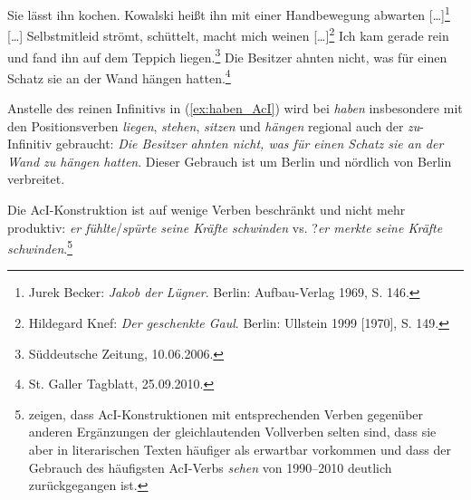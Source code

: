 \ea \label{ea:andere_AcI_Verben}
\ea \label{ea:lassen_AcI} Sie lässt ihn kochen.
 \ex \label{ex:heißen_AcI} Kowalski heißt ihn mit einer Handbewegung abwarten [\ldots{}]\footnote{Jurek Becker: \textit{Jakob der Lügner}. Berlin: Aufbau-Verlag 1969, S. 146.}
 \ex \label{ex:machen_Inf} [\ldots{}] Selbstmitleid strömt, schüttelt, macht mich weinen [\ldots{}]\footnote{Hildegard Knef: \textit{Der geschenkte Gaul}. Berlin: Ullstein 1999 [1970], S. 149.}
 \ex \label{ex:finden_AcI} Ich kam gerade rein und fand ihn auf dem Teppich liegen.\footnote{Süddeutsche Zeitung, 10.06.2006.}
 \ex \label{ex:haben_AcI} Die Besitzer ahnten nicht, was für einen Schatz sie an der Wand hängen hatten.\footnote{St. Galler Tagblatt, 25.09.2010.}
 \z 
 \z 
 
Anstelle des reinen Infinitivs in (\ref{ex:haben_AcI}) wird bei \textit{haben} insbesondere mit den Positionsverben \textit{liegen}, \textit{stehen}, \textit{sitzen} und \textit{hängen} regional auch der \textit{zu}-Infinitiv gebraucht: \textit{Die Besitzer ahnten nicht, was für einen Schatz sie an der Wand zu hängen hatten}. Dieser Gebrauch ist um Berlin und nördlich von Berlin verbreitet.

Die AcI-Konstruktion ist auf wenige Verben beschränkt und nicht mehr produktiv: \textit{er fühlte}/\textit{spürte seine Kräfte schwinden} vs. ?\textit{er merkte seine Kräfte schwinden}.\footnote{\citet[237–239]{Fuss_Konopka_Woellstein2017} zeigen, dass AcI-Konstruktionen mit entsprechenden Verben gegenüber anderen Ergänzungen der gleichlautenden Vollverben selten sind, dass sie aber in literarischen Texten häufiger als erwartbar vorkommen und dass der Gebrauch des häufigsten AcI-Verbs \textit{sehen} von 1990–2010 deutlich zurückgegangen ist.}

